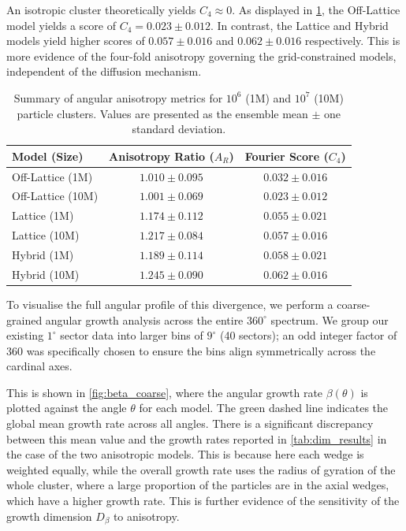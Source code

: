 \documentclass[12pt, a4paper, oneside]{report}
\theoremstyle{remark}
\begin{document}
An isotropic cluster theoretically yields $C_4 \approx 0$. As displayed in \cref{tab:anisotropy_stats}, the Off-Lattice model yields a score of $C_4 = 0.023 \pm 0.012$. In contrast, the Lattice and Hybrid models yield higher scores of $0.057 \pm 0.016$ and $0.062 \pm 0.016$ respectively. This is more evidence of the four-fold anisotropy governing the grid-constrained models, independent of the diffusion mechanism.
\begin{table}[htbp]
    \centering
    \caption{Summary of angular anisotropy metrics for $10^6$ (1M) and $10^7$ (10M) particle clusters. Values are presented as the ensemble mean $\pm$ one standard deviation.}
    \label{tab:anisotropy_stats}
    \begin{tabular}{lcc}
        \toprule
        \textbf{Model (Size)} & \textbf{Anisotropy Ratio ($A_R$)} & \textbf{Fourier Score ($C_4$)} \\
        \midrule
        Off-Lattice (1M)  & $1.010 \pm 0.095$ & $0.032 \pm 0.016$ \\
        Off-Lattice (10M) & $1.001 \pm 0.069$ & $0.023 \pm 0.012$ \\
        \midrule
        Lattice (1M)      & $1.174 \pm 0.112$ & $0.055 \pm 0.021$ \\
        Lattice (10M)     & $1.217 \pm 0.084$ & $0.057 \pm 0.016$ \\
        \midrule
        Hybrid (1M)       & $1.189 \pm 0.114$ & $0.058 \pm 0.021$ \\
        Hybrid (10M)      & $1.245 \pm 0.090$ & $0.062 \pm 0.016$ \\
        \bottomrule
    \end{tabular}
\end{table}

To visualise the full angular profile of this divergence, we perform a coarse-grained angular growth analysis across the entire $360^\circ$ spectrum. We group our existing $1^\circ$ sector data into larger bins of $9^\circ$ (40 sectors); an odd integer factor of 360 was specifically chosen to ensure the bins align symmetrically across the cardinal axes.

This is shown in \cref{fig:beta_coarse}, where the angular growth rate $\beta(\theta)$ is plotted against the angle $\theta$ for each model. The green dashed line indicates the global mean growth rate across all angles. There is a significant discrepancy between this mean value and the growth rates reported in \cref{tab:dim_results} in the case of the two anisotropic models. This is because here each wedge is weighted equally, while the overall growth rate uses the radius of gyration of the whole cluster, where a large proportion of the particles are in the axial wedges, which have a higher growth rate. 
This is further evidence of the sensitivity of the growth dimension $D_{\beta}$ to anisotropy.
\end{document}
